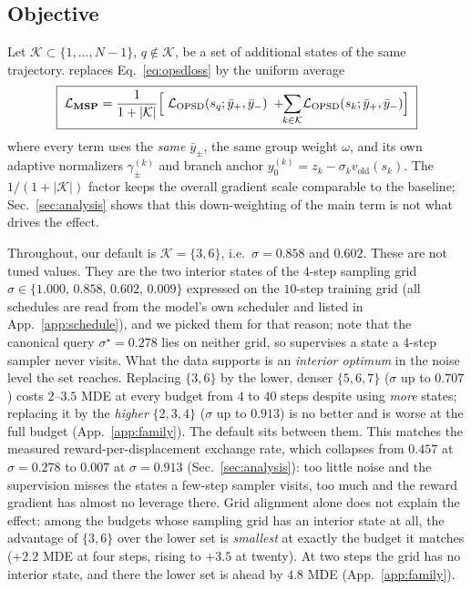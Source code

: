 \subsection{Objective}

Let $\mathcal K\subset\{1,\dots,N-1\}$, $q\notin\mathcal K$, be a set of additional states
of the same trajectory. \MSP replaces Eq.~\eqref{eq:opsdloss} by the uniform average
\begin{equation}
\boxed{\;
\mathcal L_{\textbf{MSP}}
=\frac{1}{1+|\mathcal K|}
\Big[\;\mathcal L_{\mathrm{OPSD}}(s_q;\bar y_+,\bar y_-)
\;+\!\!\sum_{k\in\mathcal K}\!\mathcal L_{\mathrm{OPSD}}(s_k;\bar y_+,\bar y_-)\Big] \; }
\label{eq:msploss}
\end{equation}
where every term uses the \emph{same} $\bar y_\pm$, the same group weight $\omega$, and
its own adaptive normalizers $\gamma_\pm^{(k)}$ and branch anchor
$y_0^{(k)}=z_k-\sigma_k v_{\mathrm{old}}(s_k)$. The $1/(1+|\mathcal K|)$ factor keeps the
overall gradient scale comparable to the baseline; Sec.~\ref{sec:analysis} shows that this
down-weighting of the main term is not what drives the effect.

Throughout, our default is $\mathcal K=\{3,6\}$, i.e.\ $\sigma=0.858$ and $0.602$. These
are not tuned values. They are the two interior states of the $4$-step sampling grid
$\sigma\in\{1.000,\,0.858,\,0.602,\,0.009\}$ expressed on the $10$-step training grid
(all schedules are read from the model's own scheduler and listed in
App.~\ref{app:schedule}), and
we picked them for that reason; note that the canonical query $\sigma^\star\!=\!0.278$ lies
on neither grid, so \opsd supervises a state a $4$-step sampler never visits. What the data supports is
an \emph{interior optimum} in the noise level the set reaches. Replacing $\{3,6\}$ by the
lower, denser $\{5,6,7\}$ ($\sigma$ up to $0.707$) costs $2$--$3.5$ MDE at every budget from
$4$ to $40$ steps despite using \emph{more} states; replacing it by the \emph{higher}
$\{2,3,4\}$ ($\sigma$ up to $0.913$) is no better and is worse at the full budget
(App.~\ref{app:family}). The default sits between them. This matches the measured
reward-per-displacement exchange rate, which collapses from $0.457$ at $\sigma=0.278$ to
$0.007$ at $\sigma=0.913$ (Sec.~\ref{sec:analysis}): too little noise and the supervision
misses the states a few-step sampler visits, too much and the reward gradient has almost
no leverage there. Grid alignment alone does not explain the effect: among the budgets whose sampling grid has
an interior state at all, the advantage of $\{3,6\}$ over the lower set is \emph{smallest}
at exactly the budget it matches ($+2.2$ MDE at four steps, rising to $+3.5$ at twenty). At
two steps the grid has no interior state, and there the lower set is ahead by $4.8$ MDE
(App.~\ref{app:family}).

